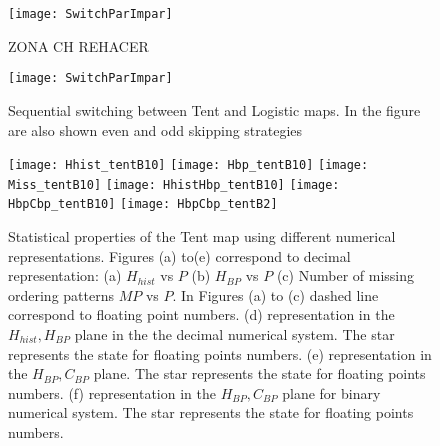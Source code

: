 %
\begin{figure}
\texttt{[image: SwitchParImpar]}
\caption{ZONA CH REHACER} \label{fig:plane zone}
\end{figure}
%
\begin{figure}
\texttt{[image: SwitchParImpar]}
\caption{Sequential switching between Tent and Logistic maps. In the figure are also shown even and odd skipping strategies} \label{fig:seq}
\end{figure}
\begin{figure}
\texttt{[image: Hhist\_tentB10]}
\texttt{[image: Hbp\_tentB10]}
\texttt{[image: Miss\_tentB10]}
\texttt{[image: HhistHbp\_tentB10]}
\texttt{[image: HbpCbp\_tentB10]}
\texttt{[image: HbpCbp\_tentB2]}
\caption{Statistical properties of the Tent map using different numerical representations. Figures (a) to(e) correspond to decimal representation: (a) $H_{hist}$ vs $P$ (b) $H_{BP}$ vs $P$ (c) Number of missing ordering patterns $MP$ vs $P$. In Figures (a) to (c) dashed line correspond to floating point numbers. (d) representation in the $H_{hist},H_{BP}$ plane in the the decimal numerical system.  The star represents the state for floating points numbers. (e) representation in the $H_{BP},C_{BP}$ plane.  The star represents the state for floating points numbers. (f) representation in the $H_{BP},C_{BP}$ plane for binary numerical system.  The star represents the state for floating points numbers. } \label{fig:tent}
\end{figure}

